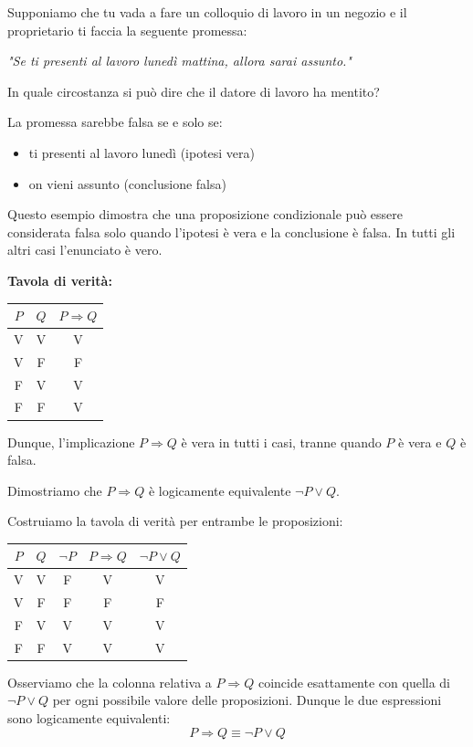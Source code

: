 \begin{esempio} Supponiamo che tu vada a fare un colloquio di lavoro in un negozio e il proprietario ti faccia la seguente promessa:

\textit{"Se ti presenti al lavoro lunedì mattina, allora sarai assunto."}

In quale circostanza si può dire che il datore di lavoro ha mentito?

La promessa sarebbe falsa se e solo se:
\begin{itemize}
    \item ti presenti al lavoro lunedì (ipotesi vera)
    \item on vieni assunto (conclusione falsa)
\end{itemize}

Questo esempio dimostra che una proposizione condizionale può essere considerata falsa solo quando l'ipotesi è vera e la conclusione è falsa. In tutti gli altri casi l'enunciato è vero.
\medskip 

\textbf{Tavola di verità:}
\begin{center}
\begin{tabular}{c|c|c}
  \(P\) & \(Q\) & \(P \Rightarrow Q\) \\
  \hline
  V & V & V \\
  V & F & F \\
  F & V & V \\
  F & F & V \\
\end{tabular}
\end{center}
Dunque, l'implicazione \(P \Rightarrow Q\) è vera in tutti i casi, tranne quando   \(P\) è vera e \(Q\) è falsa.

\end{esempio}






\begin{esempio}
Dimostriamo che \(P \Rightarrow Q \) è logicamente equivalente  \( \neg P \lor Q\).

\medskip

Costruiamo la tavola di verità per entrambe le proposizioni:
\begin{center}
\begin{tabular}{c|c|c|c|c}
  \(P\) & \(Q\) & \(\neg P\) & \(P \Rightarrow Q\) & \(\neg P \lor Q\) \\
  \hline
  V & V & F & V & V \\
  V & F & F & F & F \\
  F & V & V & V & V \\
  F & F & V & V & V \\
\end{tabular}
\end{center}
Osserviamo che la colonna relativa a \(P \Rightarrow Q\) coincide esattamente con quella di \(\neg P \lor Q\) per ogni possibile valore delle proposizioni. Dunque le due espressioni sono logicamente equivalenti:
\[
P \Rightarrow Q \equiv \neg P \lor Q
\]
\end{esempio}


